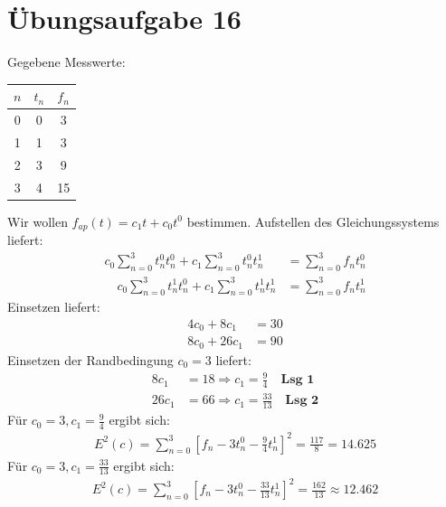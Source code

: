 

    \section*{Übungsaufgabe 16}
    Gegebene Messwerte: \\
    \begin{center}
    \begin{tabular}{|c|c|c|}
        \hline 
        $n$ & $t_n$ & $f_n$ \\
        \hline
        0   &  0    & 3 \\
        1   &  1    & 3 \\
        2   &  3    & 9 \\
        3   &  4    & 15 \\
        \hline
    \end{tabular}
    \end{center}
    Wir wollen $f_{ap}(t) = c_1 t + c_0 t^0$ bestimmen. Aufstellen des Gleichungssystems liefert:
    \begin{align*}
        c_0 \sum_{n=0}^{3} t_n^0 t_n^0 + c_1 \sum_{n=0}^3 t_n^0 t_n^1 &= \sum_{n=0}^3 f_n t_n^0 \\
        \quad c_0 \sum_{n=0}^{3} t_n^1 t_n^0 + c_1 \sum_{n=0}^3 t_n^1 t_n^1 &= \sum_{n=0}^3 f_n t_n^1
    \end{align*}
    Einsetzen liefert:
    \begin{align*}
        4c_0 + 8c_1 &= 30 \\
        8c_0 + 26c_1 &= 90
    \end{align*}
    Einsetzen der Randbedingung $c_0 = 3$ liefert:
    \begin{align*}
        8c_1 &= 18  \Rightarrow c_1 = \frac{9}{4} \quad \textbf{Lsg 1} \\
        26c_1 &= 66 \Rightarrow c_1 = \frac{33}{13} \quad \textbf{Lsg 2}
    \end{align*}
    Für $c_0 = 3, c_1 = \frac{9}{4}$ ergibt sich:
    \begin{align*}
        E^2(c) = \sum_{n=0}^3 \left[ f_n - 3t_n^0 - \frac{9}{4}t_n^1 \right]^2 = \frac{117}{8} = 14.625
    \end{align*}
    Für $c_0 = 3, c_1 = \frac{33}{13}$ ergibt sich:
    \begin{align*}
        E^2(c) = \sum_{n=0}^3 \left[ f_n - 3t_n^0 - \frac{33}{13}t_n^1 \right]^2 = \frac{162}{13} \approx 12.462 
    \end{align*}
